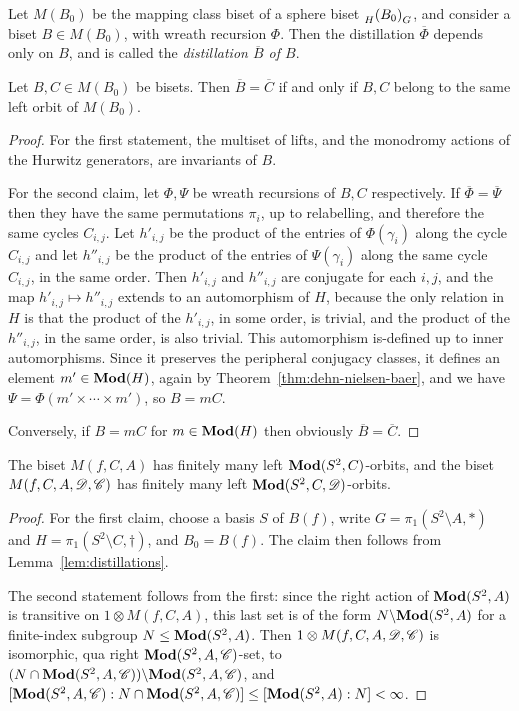 \documentclass{amsart}
\begin{document}
\begin{lem}\label{lem:distillations}
  Let $M(B_0)$ be the mapping class biset of a sphere biset
  $\subscript H{(B_0)}_G$, and consider a biset $B\in M(B_0)$, with
  wreath recursion $\Phi$. Then the distillation $\overline\Phi$
  depends only on $B$, and is called the \emph{distillation $\overline
    B$ of $B$}.

  Let $B,C\in M(B_0)$ be bisets. Then $\overline B=\overline C$ if
  and only if $B,C$ belong to the same left orbit of $M(B_0)$.
\end{lem}
\begin{proof}
  For the first statement, the multiset of lifts, and the monodromy
  actions of the Hurwitz generators, are invariants of $B$.

  For the second claim, let $\Phi,\Psi$ be wreath recursions of $B,C$
  respectively.  If $\overline\Phi=\overline\Psi$ then they have the
  same permutations $\pi_i$, up to relabelling, and therefore the same
  cycles $C_{i,j}$. Let $h'_{i,j}$ be the product of the entries of
  $\Phi(\gamma_i)$ along the cycle $C_{i,j}$ and let $h''_{i,j}$ be
  the product of the entries of $\Psi(\gamma_i)$ along the same cycle
  $C_{i,j}$, in the same order. Then $h'_{i,j}$ and $h''_{i,j}$ are
  conjugate for each $i,j$, and the map $h'_{i,j}\mapsto h''_{i,j}$
  extends to an automorphism of $H$, because the only relation in $H$
  is that the product of the $h'_{i,j}$, in some order, is trivial,
  and the product of the $h''_{i,j}$, in the same order, is also
  trivial. This automorphism is-defined up to inner
  automorphisms. Since it preserves the peripheral conjugacy classes,
  it defines an element $m'\in\mathbf{\relax Mod}(H)$, again by
  Theorem~\ref{thm:dehn-nielsen-baer}, and we have $\Psi=\Phi
  (m'\times\cdots\times m')$, so $B=m C$.

  Conversely, if $B=m C$ for $m\in\mathbf{\relax Mod}(H)$ then obviously $\overline
  B=\overline C$.
\end{proof}

\begin{prop}\label{prop:MCBfinite}
  The biset $M(f,C,A)$ has finitely many left $\mathbf{\relax Mod}(S^2,C)$-orbits,
  and the biset $M(f,C,A,{\mathscr D},{\mathscr C})$ has finitely many left
  $\mathbf{\relax Mod}(S^2,C,{\mathscr D})$-orbits.
\end{prop}
\begin{proof}
  For the first claim, choose a basis $S$ of $B(f)$, write
  $G=\pi_1(S^2\setminus A,*)$ and $H=\pi_1(S^2\setminus C,\dagger)$,
  and $B_0=B(f)$. The claim then follows from
  Lemma~\ref{lem:distillations}.

  The second statement follows from the first: since the right action
  of $\mathbf{\relax Mod}(S^2,A)$ is transitive on $1\otimes M(f,C,A)$, this last set
  is of the form $N\backslash\mathbf{\relax Mod}(S^2,A)$ for a finite-index subgroup
  $N\le\mathbf{\relax Mod}(S^2,A)$. Then $1\otimes M(f,C,A,{\mathscr D},{\mathscr C})$ is isomorphic,
  qua right $\mathbf{\relax Mod}(S^2,A,{\mathscr C})$-set, to
  $(N\cap\mathbf{\relax Mod}(S^2,A,{\mathscr C}))\backslash\mathbf{\relax Mod}(S^2,A,{\mathscr C})$, and
  $[\mathbf{\relax Mod}(S^2,A,{\mathscr C}):N\cap\mathbf{\relax Mod}(S^2,A,{\mathscr C})]\le[\mathbf{\relax Mod}(S^2,A):N]<\infty$.
\end{proof}
\end{document}
